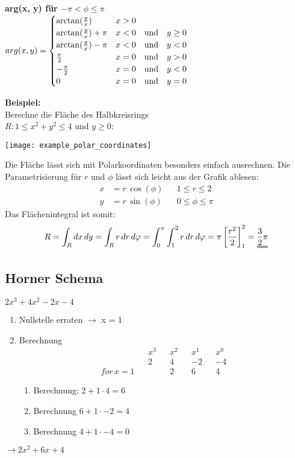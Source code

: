 \textbf{arg(x, y) für $-\pi < \phi \leq \pi$}\\
$arg(x, y) =
\begin{cases}
	\arctan(\frac{y}{x})				& x > 0 \\
	\arctan(\frac{y}{x}) + \pi			& x < 0 \hspace{10pt} \text{und} \hspace{10pt} y \geq 0 \\
	\arctan(\frac{y}{x}) - \pi			& x < 0 \hspace{10pt} \text{und} \hspace{10pt} y < 0 \\
	\frac{\pi}{2}						& x = 0 \hspace{10pt} \text{und} \hspace{10pt} y > 0\\
	-\frac{\pi}{2}						& x = 0 \hspace{10pt} \text{und} \hspace{10pt} y < 0\\
	0 									& x = 0 \hspace{10pt} \text{und} \hspace{10pt} y = 0
\end{cases}
$\\
\begin{minipage}{0.68\columnwidth}
	\textbf{Beispiel:}\\
	Berechne die Fläche des Halbkreisrings\\
	$R: 1 \leq x^2 + y^2 \leq 4$ und $y \geq 0$:
\end{minipage}
\begin{minipage}{0.31\columnwidth}
	\texttt{[image: example\_polar\_coordinates]}
\end{minipage}

Die Fläche lässt sich mit Polarkoordinaten besonders einfach ausrechnen. Die Parametrisierung für $r$ und $\phi$ lässt sich leicht aus der Grafik ablesen:
\begin{align*}
	x &= r \, \cos(\phi)	&& 1 \leq r \leq 2 \\
	y &= r \, \sin(\phi)	&& 0 \leq \phi \leq \pi
\end{align*}
Das Flächenintegral ist somit:
\begin{align*}
	R = \int_R dx \, dy = \int_R r \, dr \, d\phi = \int_0^{\pi} \int_1^2 r \, dr \, d\phi = \pi \left[\frac{r^2}{2}\right]_1^2 = \uuline{\frac{3}{2} \pi}
\end{align*}

\subsection{Horner Schema}
$2x^3 + 4x^2 -2x -4$
\begin{enumerate}
	\item Nullstelle erraten $\rightarrow$ x = 1
	\item Berechnung
	\begin{align*}
	 &&x^3 	&& x^2 && x^1 && x^0 \\
	 &&2 && 4 && -2 && -4 \\
	for\,x= 1 &&  && 2 && 6 && 4
	\end{align*}
	\begin{enumerate}
		\item Berechnung: $ 2 + 1 \cdot 4 = 6$
		\item Berechnung $ 6 + 1 \cdot -2 = 4$
		\item Berechnung $ 4 + 1\cdot -4 = 0$
	\end{enumerate}
\end{enumerate}
$\rightarrow 2x^2 + 6x + 4$

